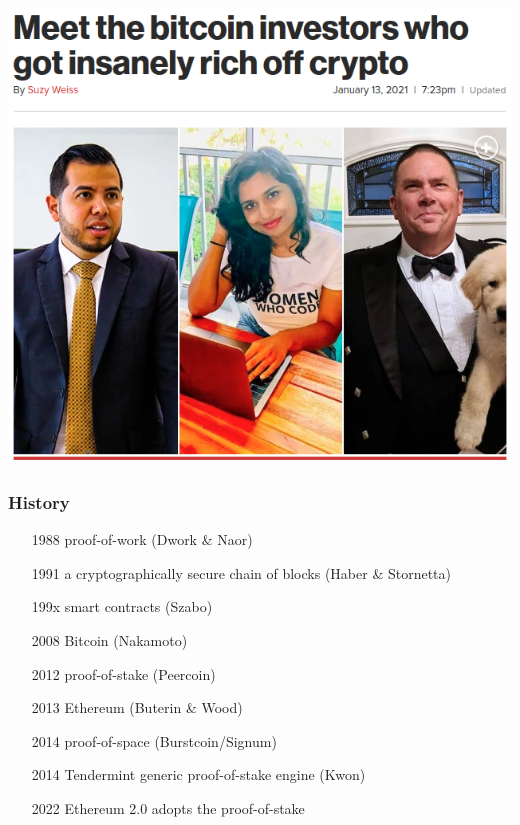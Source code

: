 \documentclass[11pt]{beamer}  %
\begin{document}
\begin{frame}
\begin{center}
    \includegraphics[scale=0.29,clip=false]{pictures/insane.png}
  \end{center}

\end{frame}

\begin{frame}\frametitle{History}

  \begin{itemize}
  \item[1988] proof-of-work (Dwork \& Naor)
  \item[1991] a cryptographically secure chain of blocks (Haber \& Stornetta)
  \item[199x] smart contracts (Szabo)
  \item[2008] Bitcoin (Nakamoto)
  \item[2012] proof-of-stake (Peercoin)
  \item[2013] Ethereum (Buterin \& Wood)
  \item[2014] proof-of-space (Burstcoin/Signum)
  \item[2014] Tendermint generic proof-of-stake engine (Kwon)
  \item[2022] Ethereum 2.0 adopts the proof-of-stake
  \end{itemize}
  
\end{frame}
\end{document}
